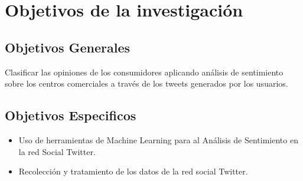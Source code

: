 
\chapter{Objetivos de la investigaci\'on}
\label{intro}


\section{Objetivos Generales}
Clasificar las opiniones de los consumidores aplicando análisis de sentimiento sobre los centros comerciales a través de los tweets generados por los usuarios.


\section{Objetivos Especificos}
\begin{itemize}
\item Uso de herramientas de Machine Learning para al Análisis de Sentimiento en la red Social Twitter.
\item  Recolecci\'on y tratamiento de los datos de la red social Twitter.
\end{itemize}


\cleardoublepage
